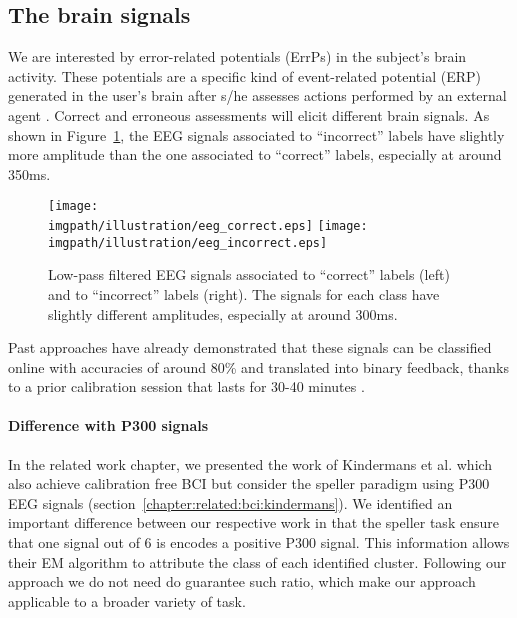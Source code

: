 \subsection{The brain signals}

We are interested by error-related potentials (ErrPs) in the subject's brain activity. These potentials are a specific kind of event-related potential (ERP) generated in the user's brain after s/he assesses actions performed by an external agent \cite{chavarriaga2010learning}. Correct and erroneous assessments will elicit different brain signals. As shown in Figure~\ref{fig:EEGsample}, the EEG signals associated to ``incorrect'' labels have slightly more amplitude than the one associated to ``correct'' labels, especially at around 350ms.

\begin{figure}[!htbp]
\centering
\texttt{[image: \\imgpath/illustration/eeg\_correct.eps]}
\texttt{[image: \\imgpath/illustration/eeg\_incorrect.eps]}
\caption{Low-pass filtered EEG signals associated to ``correct'' labels (left) and to ``incorrect'' labels (right). The signals for each class have slightly different amplitudes, especially at around 300ms.}
\label{fig:EEGsample}
\end{figure}

Past approaches have already demonstrated that these signals can be classified online with accuracies of around 80\% and translated into binary feedback, thanks to a prior calibration session that lasts for 30-40 minutes \cite{chavarriaga2010learning, iturrate2013task}.

\paragraph{Difference with P300 signals} In the related work chapter, we presented the work of Kindermans et al. which also achieve calibration free BCI but consider the speller paradigm using P300 EEG signals (section~\ref{chapter:related:bci:kindermans}). We identified an important difference between our respective work in that the speller task ensure that one signal out of 6 is encodes a positive P300 signal. This information allows their EM algorithm to attribute the class of each identified cluster. Following our approach we do not need do guarantee such ratio, which make our approach applicable to a broader variety of task.

